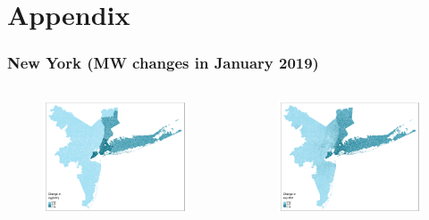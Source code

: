\documentclass[aspectratio=169, t]{beamer}
\begin{document}
\section{Appendix}

\begin{frame}[label = nyc_example]
\frametitle{New York (MW changes in January 2019)}
    \begin{columns}
        \begin{column}{0.50\textwidth}
            \vspace{-4mm}
            \begin{figure}
                \centering
                \includegraphics[scale = 0.36]{maps_events/output/nyc_2018-12_actual_mw.png}
            \end{figure}   
        \end{column}
        \begin{column}{0.50\textwidth}
            \vspace{-4mm}
            \begin{figure}
                \centering
                \includegraphics[scale = 0.36]{maps_events/output/nyc2018-12_exp_mw.png}

\end{figure}
\end{column}
\end{columns}
\end{frame}
\end{document}
